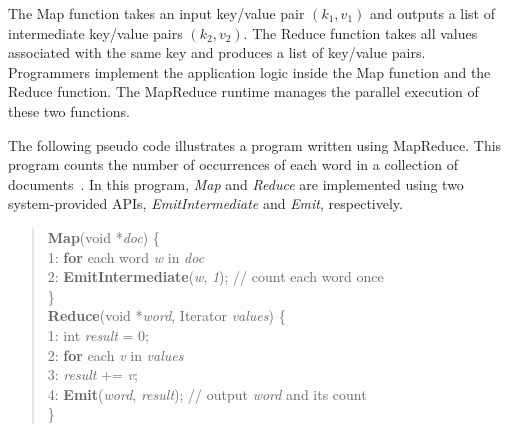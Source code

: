 The Map function takes an input key/value pair $(k_1, v_1)$ and outputs a list of intermediate key/value pairs $(k_2, v_2)$.
The Reduce function takes all values associated with the same key and produces a list of key/value pairs.
Programmers implement the application logic inside the Map function and the Reduce function.
The MapReduce runtime manages the parallel execution of these two functions.



The following pseudo code illustrates a program written using MapReduce.
This program counts the number of occurrences of each word in a collection of documents~\cite{Dean2008}.
In this program, {\em Map} and {\em Reduce} are implemented using two system-provided APIs, {\em EmitIntermediate} and {\em Emit}, respectively.

\begin{quote}
{\bf Map}(void *{\em doc}) \{ \\
1: {\bf for} each word {\em w} in {\em doc} \\
2: \hspace{3mm} {\bf EmitIntermediate}({\em w}, {\em 1}); // count each word once \\
\} \\
{\bf Reduce}(void *{\em word}, Iterator {\em values}) \{ \\
1: int {\em result} = 0; \\
2: {\bf for} each {\em v} in {\em values} \\
3: \hspace{3mm} {\em result} += {\em v}; \\
4: {\bf Emit}({\em word}, {\em result}); // output {\em word} and its count \\
\}
\end{quote}


